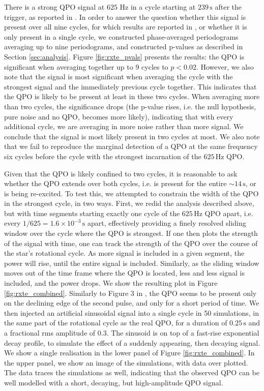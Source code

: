 \documentclass{emulateapj}
\begin{document}
There is a strong QPO signal at $625$ Hz in a cycle starting at $239\, \mathrm{s}$ after the trigger, as reported in \citet{strohmayer06}. In order to answer the question whether this signal is present over all nine cycles, for which results are reported in \citet{strohmayer05}, or whether it is only present in a single cycle, we constructed phase-averaged periodograms averaging up to nine periodograms, and constructed p-values as described in Section \ref{sec:analysis}. Figure \ref{fig:rxte_pvals} presents the results: the QPO is significant when averaging together up to $9$ cycles to $p < 0.02$. However, we also note that the signal is most significant when averaging the cycle with the strongest signal and the immediately previous cycle together. This indicates that the QPO is likely to be present at least in these two cycles. When averaging more than two cycles, the significance drops (the p-value rises, i.e. the null hypothesis, pure noise and no QPO, becomes more likely), indicating that with every additional cycle, we are averaging in more noise rather than more signal. We conclude that the signal is most likely present in two cycles at most.
We also note that we fail to reproduce the marginal detection of a QPO at the same frequency six cycles before the cycle with the strongest incarnation of the $625\, \mathrm{Hz}$ QPO. 

Given that the QPO is likely confined to two cycles, it is reasonable to ask whether the QPO extends over both cycles, i.e. is present for the entire $\sim 14\, \mathrm{s}$, or is being re-excited. To test this, we attempted to constrain the width of the QPO in the strongest cycle, in two ways. First, we redid the analysis described above, but with time segments starting exactly one cycle of the $625 \, \mathrm{Hz}$ QPO apart, i.e. every $1/625 = 1.6 \times 10^{-3} \, \mathrm{s}$ apart, effectively providing a finely resolved sliding window over the cycle where the QPO is strongest. If one then plots the strength of the signal with time, one can track the strength of the QPO over the course of the star's rotational cycle. As more signal is included in a given segment, the power will rise, until the entire signal is included. Similarly, as the sliding window moves out of the time frame where the QPO is located, less and less signal is included, and the power drops. We show the resulting plot in Figure \ref{fig:rxte_combined}. Similarly to Figure 3 in \citet{strohmayer06}, the QPO seems to be present only on the declining edge of the second pulse, and only for a short period of time. We then injected an artificial sinusoidal signal into a single cycle in 50 simulations, in the same part of the rotational cycle as the real QPO, for a duration of $0.25\, \mathrm{s}$ and a fractional rms amplitude of $0.3$. The sinusoid is on top of a fast-rise exponential decay profile, to simulate the effect of a suddenly appearing, then decaying signal. We show a single realisation in the lower panel of Figure \ref{fig:rxte_combined}. In the upper panel, we show an image of the simulations, with data over plotted. The data traces the simulations as well, indicating that the observed QPO can be well modelled with a short, decaying, but high-amplitude QPO signal. 
\end{document}

